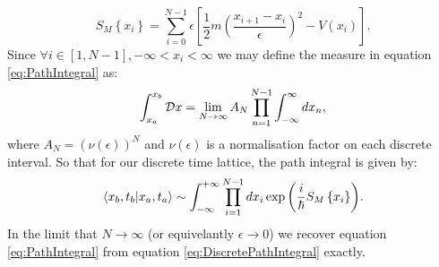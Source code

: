 \documentclass[12pt]{article}
\begin{document}
\begin{equation}
	\label{eq:DiscreteMinkowskiAction}
	S_{M}\left\{x_i\right\} = \sum_{i=0}^{N-1} \epsilon \left[\frac{1}{2}m\left(\frac{x_{i+1}-x_{i}}{\epsilon}\right)^{2} - V\left(x_i\right)\right].
\end{equation}
Since $\forall i \in \left[1,N-1\right], -\infty < x_i < \infty$ we may define the measure in equation \ref{eq:PathIntegral} as:
\begin{equation}
	\label{eq:IntegralMeasure}
	\int_{x_a}^{x_b} {\cal D} x = \lim_{N\rightarrow \infty} A_{N}\prod_{n=1}^{N-1}\int_{-\infty}^{\infty}dx_n,
\end{equation}
where $A_N = \left(\nu \left(\epsilon\right)\right)^{N}$ and $\nu \left(\epsilon\right)$ is a normalisation factor on each discrete interval. So that for our discrete time lattice, the path integral is given by:
\begin{equation}
	\label{eq:DiscretePathIntegral}
	\braket{x_b,t_b|x_a,t_a} \sim \int^{+\infty}_{-\infty}\prod_{i=1}^{N-1}dx_i \exp{\left(\frac{i}{\hbar}S_M\left\{x_i\right\}\right)}.
\end{equation}
In the limit that $N\rightarrow \infty$ (or equivelantly $\epsilon \rightarrow 0$) we recover equation \ref{eq:PathIntegral} from equation \ref{eq:DiscretePathIntegral} exactly. 
\end{document}

